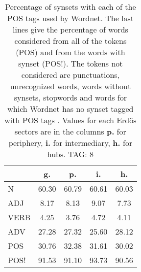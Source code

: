 \begin{table}[h!]
\begin{center}
\begin{tabular}{| l || c | c | c | c |}\hline
 & {\bf g.} & {\bf p.} & {\bf i.} & {\bf h.} \\\hline\hline
N & 60.30  & 60.79  & 60.61  & 60.03 \\\hline
ADJ & 8.17  & 8.13  & 9.07  & 7.73 \\\hline
VERB & 4.25  & 3.76  & 4.72  & 4.11 \\\hline
ADV & 27.28  & 27.32  & 25.60  & 28.12 \\\hline\hline
POS & 30.76  & 32.38  & 31.61  & 30.02 \\\hline
POS! & 91.53  & 91.10  & 93.73  & 90.56 \\\hline
\end{tabular}
\caption{Percentage of synsets with each of the POS tags used by Wordnet. The last lines give the percentage of words considered from all of the tokens (POS) and from the words with synset (POS!). The tokens not considered are punctuations, unrecognized words, words without synsets, stopwords and words for which Wordnet has no synset  tagged with POS tags . Values for each Erd\"os sectors are in the columns {{\bf p.}} for periphery, {{\bf i.}} for intermediary, {{\bf h.}} for hubs. TAG: 8}
\end{center}
\end{table}